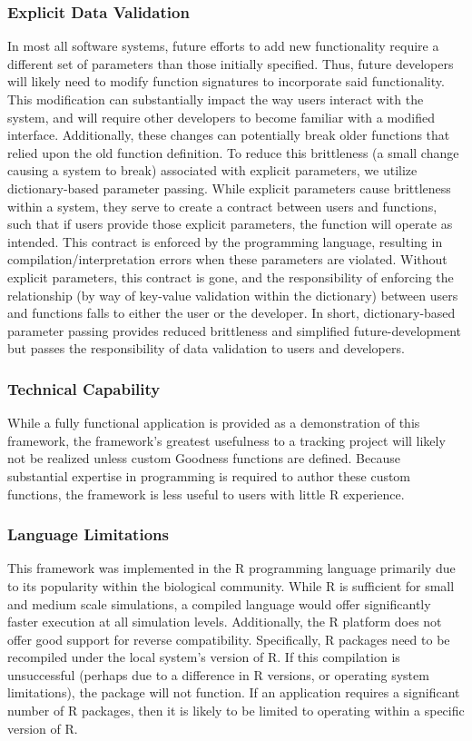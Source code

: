 \subsubsection{Explicit Data Validation}
In most all software systems, future efforts to add new functionality require a different set of parameters than those initially specified.  Thus, future developers will likely need to modify function signatures to incorporate said functionality.  This modification can substantially impact the way users interact with the system, and will require other developers to become familiar with a modified interface.  Additionally, these changes can potentially break older functions that relied upon the old function definition.  To reduce this brittleness (a small change causing a system to break) associated with explicit parameters, we utilize dictionary-based parameter passing.  While explicit parameters cause brittleness within a system, they serve to create a contract between users and functions, such that if users provide those explicit parameters, the function will operate as intended.  This contract is enforced by the programming language, resulting in compilation/interpretation errors when these parameters are violated.  Without explicit parameters, this contract is gone, and the responsibility of enforcing the relationship (by way of key-value validation within the dictionary) between users and functions falls to either the user or the developer.  In short, dictionary-based parameter passing provides reduced brittleness and simplified future-development but passes the responsibility of data validation to users and developers.

\subsubsection{Technical Capability}
While a fully functional application is provided as a demonstration of this framework, the framework's greatest usefulness to a tracking project will likely not be realized unless custom Goodness functions are defined.  Because substantial expertise in programming is required to author these custom functions, the framework is less useful to users with little R experience.  

\subsubsection{Language Limitations}
This framework was implemented in the R programming language primarily due to its popularity within the biological community.  While R is sufficient for small and medium scale simulations, a compiled language would offer significantly faster execution at all simulation levels.  Additionally, the R platform does not offer good support for reverse compatibility.  Specifically, R packages need to be recompiled under the local system's version of R.  If this compilation is unsuccessful (perhaps due to a difference in R versions, or operating system limitations), the package will not function.  If an application requires a significant number of R packages, then it is likely to be limited to operating within a specific version of R.

